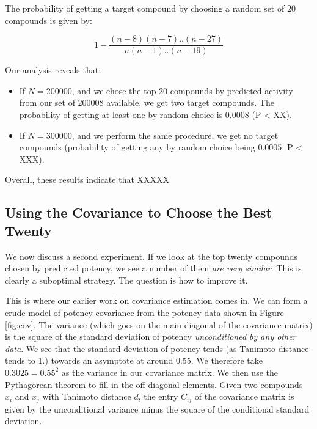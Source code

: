 \documentclass[journal=jacsat,manuscript=article]{achemso}
\begin{document}
The probability of getting a target compound by choosing a random set of 20 compounds is given by:

\begin{equation}
    1-\frac{(n-8)(n-7)..(n-27)}{n(n-1)..(n-19)}
\end{equation}

Our analysis reveals that:
\begin{itemize}
    \item If $N=200000$, and we chose the top 20 compounds by predicted activity from our set of 200008 available, we get two target compounds.  The probability of getting at least one by random choice is $0.0008$ (P < XX).
    \item If $N=300000$, and we perform the same procedure, we get no target compounds (probability of getting any by random choice being $0.0005$; P < XXX).  
\end{itemize}

Overall, these results indicate that XXXXX

\subsection*{Using the Covariance to Choose the Best Twenty}
We now discuss a second experiment.  If we look at the top twenty compounds chosen by predicted potency, we see a number of them \textit{are very similar}.  This is clearly a suboptimal strategy. The question is how to improve it.

This is where our earlier work on covariance estimation comes in.  We can form a crude model of potency covariance from the potency data shown in Figure \ref{fig:cov}.  The variance (which goes on the main diagonal of the covariance matrix) is the square of the standard deviation of potency \textit{unconditioned by any other data}.  We see that the standard deviation of potency tends (as Tanimoto distance tends to 1.) towards an asymptote at around 0.55.  We therefore take $0.3025 = 0.55^2$ as the variance in our covariance matrix.  We then use the Pythagorean theorem to fill in the off-diagonal elements.  Given two compounds $x_i$ and $x_j$ with Tanimoto distance $d$, the entry $C_{ij}$ of the covariance matrix is given by the unconditional variance minus the square of the conditional standard deviation.
\end{document}
